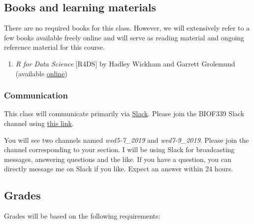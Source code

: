 \documentclass[
]{article}
\providecommand{\tightlist}{%
  \setlength{\itemsep}{0pt}\setlength{\parskip}{0pt}}
\begin{document}
\hypertarget{books-and-learning-materials}{%
\subsection{Books and learning
materials}\label{books-and-learning-materials}}

There are no required books for this class. However, we will extensively
refer to a few books available freely online and will serve as reading
material and ongoing reference material for this course.

\begin{enumerate}
\def\labelenumi{\arabic{enumi}.}
\tightlist
\item
  \emph{R for Data Science} {[}R4DS{]} by Hadley Wickham and Garrett
  Grolemund (available \href{https://r4ds.had.co.nz/}{online})
\end{enumerate}

\hypertarget{communication}{%
\subsubsection{Communication}\label{communication}}

This class will communicate primarily via
\href{http://www.slack.com}{Slack}. Please join the BIOF339 Slack
channel using
\href{https://join.slack.com/t/biof339/shared_invite/enQtNzU1Njk5NDc2MDMyLWU5MjkwNzNlMmRlYTAwNDg2MGZjYWQ1YzEzMDUxMzc0MzE1NjZkMDFlY2Y0NTIyMGI2Y2VkODBiYmY0MjBiMzE}{this
link}.

You will see two channels named \emph{wed5-7\_2019} and
\emph{wed7-9\_2019}. Please join the channel corresponding to your
section. I will be using Slack for broadcasting messages, answering
questions and the like. If you have a question, you can directly message
me on Slack if you like. Expect an answer within 24 hours.

\hypertarget{grades}{%
\subsection{Grades}\label{grades}}

Grades will be based on the following requirements:
\end{document}
